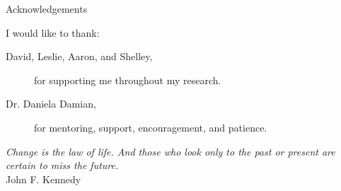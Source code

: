 \newpage
{}

\begin{center}
Acknowledgements
\end{center}

\noindent I would like to thank:
\begin{description}
\item[David, Leslie, Aaron, and Shelley,]
	for supporting me throughout my research.
\item[Dr. Daniela Damian,]
	for  mentoring, support, encouragement, and patience.
\end{description}

\begin{flushright}
\textit{Change is the law of life. And those who look only to the past or present are certain to miss the future.}
\\
John F. Kennedy \\
\end{flushright}

